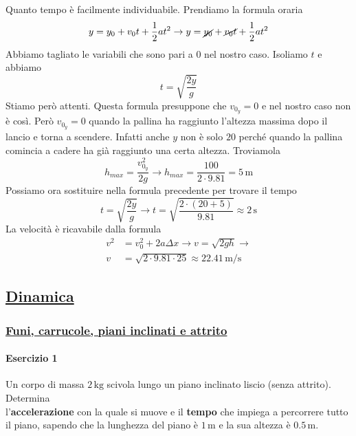 Quanto tempo è facilmente individuabile. Prendiamo la formula oraria
\begin{equation*}
  y = y_0 + v_0t+\frac{1}{2}at^2 \rightarrow y = \cancel{y_0}+\cancel{v_0t}+\frac{1}{2}at^2
\end{equation*}
Abbiamo tagliato le variabili che sono pari a $0$ nel nostro caso. Isoliamo $t$ e abbiamo
\begin{equation*}
  t = \sqrt{\frac{2y}{g}}
\end{equation*}
Stiamo però attenti. Questa formula presuppone che $v_{0_y} = 0$ e nel nostro caso non è così. Però
$v_{0_y} = 0$ quando la pallina ha raggiunto l'altezza massima dopo il lancio e torna a scendere.
Infatti anche $y$ non è solo $20$ perché quando la pallina comincia a cadere ha già raggiunto una 
certa altezza. Troviamola
\begin{equation*}
  h_{max} = \frac{v_{0_y}^2}{2g} \rightarrow h_{max} = \frac{100}{2\cdot9.81} = 5\,\text{m}
\end{equation*}
Possiamo ora sostituire nella formula precedente per trovare il tempo
\begin{equation*}
  t = \sqrt{\frac{2y}{g}} \rightarrow t = \sqrt{\frac{2\cdot(20+5)}{9.81}} \approx\boxed{2\,\text{s}}
\end{equation*}
La velocità è ricavabile dalla formula
\begin{align*}
  v^2 &= v_0^2 + 2a\Delta x \rightarrow v = \sqrt{2gh} \rightarrow\\
  v &= \sqrt{2\cdot9.81\cdot25}\approx
  \boxed{22.41\,\text{m/s}}
\end{align*}

\subsection*{\hyperref[sec:dinamica]{Dinamica}}\label{ex:dinamica}
\subsubsection*{\hyperref[subsec:dinamica:piano]{Funi, carrucole, piani inclinati e attrito}}
\label{ex:dinamica:piano}
\paragraph{Esercizio 1}
Un corpo di massa $2\,\text{kg}$ scivola lungo un piano inclinato liscio (senza attrito). Determina \\
l'\textbf{accelerazione} con la quale si muove e il \textbf{tempo} che impiega a percorrere tutto il
piano, sapendo che la lunghezza del piano è $1\,\text{m}$ e la sua altezza è $0.5\,\text{m}$.
\divisor

